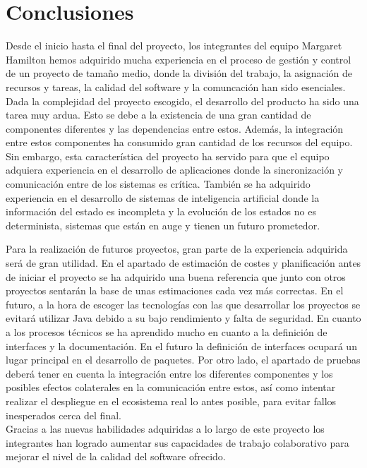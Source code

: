 \section{Conclusiones}
\label{conclusiones}

Desde el inicio hasta el final del proyecto, los integrantes del equipo Margaret Hamilton hemos adquirido mucha experiencia en el proceso de gestión y control de un proyecto de tamaño medio, donde la división del trabajo, la asignación de recursos y tareas, la calidad del software y la comuncación han sido esenciales. Dada la complejidad del proyecto escogido, el desarrollo del producto ha sido una tarea muy ardua. Esto se debe a la existencia de una gran cantidad de componentes diferentes y las dependencias entre estos. Además, la integración entre estos componentes ha consumido gran cantidad de los recursos del equipo. Sin embargo, esta característica del proyecto ha servido para que el equipo adquiera experiencia en el desarrollo de aplicaciones donde la sincronización y comunicación entre de los sistemas es crítica. También se ha adquirido experiencia en el desarrollo de sistemas de inteligencia artificial donde la información del estado es incompleta y la evolución de los estados no es determinista, sistemas que están en auge y tienen un futuro prometedor.

Para la realización de futuros proyectos, gran parte de la experiencia adquirida será de gran utilidad. En el apartado de estimación de costes y planificación antes de iniciar el proyecto se ha adquirido una buena referencia que junto con otros proyectos sentarán la base de unas estimaciones cada vez más correctas. En el futuro, a la hora de escoger las tecnologías con las que desarrollar los proyectos se evitará utilizar Java debido a su bajo rendimiento y falta de seguridad. En cuanto a los procesos técnicos se ha aprendido mucho en cuanto a la definición de interfaces y la documentación. En el futuro la definición de interfaces ocupará un lugar principal en el desarrollo de paquetes. Por otro lado, el apartado de pruebas deberá tener en cuenta la integración entre los diferentes componentes y los posibles efectos colaterales en la comunicación entre estos, así como intentar realizar el despliegue en el ecosistema real lo antes posible, para evitar fallos inesperados cerca del final.
\\
Gracias a las nuevas habilidades adquiridas a lo largo de este proyecto los integrantes han logrado aumentar sus capacidades de trabajo colaborativo para mejorar el nivel de la calidad del software ofrecido.

